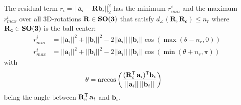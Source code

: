 \begin{theorem}
	
	The residual term $r_i = ||\mathbf{a}_i - \mathbf{R}\mathbf{b}_i ||_2^2$
	has the minimum $r_{min}^i$ and the maximum $r_{max}^i$
	over all 3D-rotations $\mathbf{R} \in \mathbf{SO(3)}$ that satisfy $d_{\angle}(\mathbf{R}, \mathbf{R_c}) \leq n_r$ where $\mathbf{R_c} \in \mathbf{SO(3)}$ is the ball center:
	\begin{equation}
		\begin{aligned}
			r_{min}^i &= ||\mathbf{a}_i||^2 + ||\mathbf{b}_i||^2 - 2 ||\mathbf{a}_i|| \, ||\mathbf{b}_i|| \cos (\max(\theta - n_r, 0))\\
			r_{max}^i &= ||\mathbf{a}_i||^2 + ||\mathbf{b}_i||^2 - 2 ||\mathbf{a}_i|| \, ||\mathbf{b}_i|| \cos (\min(\theta + n_r, \pi))
		\end{aligned}
	\end{equation}
	with 
	\begin{equation}
		\begin{aligned}
			\theta &= \arccos \left( \frac{(\mathbf{R}_c^{\mathsf{T}} \, \mathbf{a}_i )^{\mathsf{T}} \mathbf{b}_i}
			{||\mathbf{a}_i|| \, || \mathbf{b}_i||} \right)
		\end{aligned}
	\end{equation}
	being the angle between $\mathbf{R}_c^{\mathsf{T}} \, \mathbf{a}_i $ and $\mathbf{b}_i$.
	
\end{theorem} 

